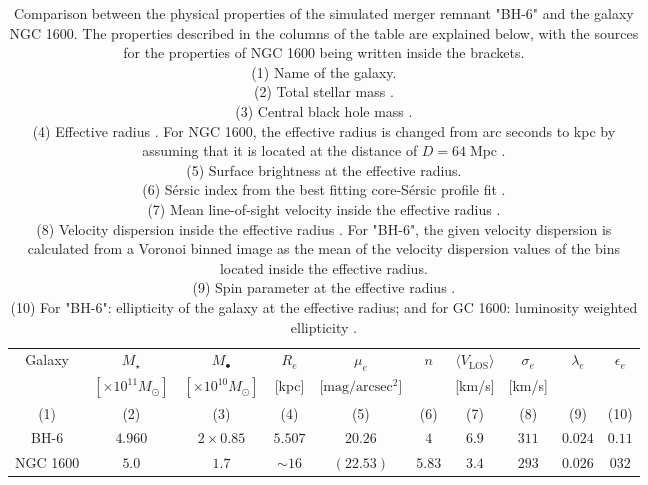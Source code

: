 \documentclass[english, oneside]{HYgradu}
\begin{document}
\begin{table}
	\begin{center}
		\scriptsize
		\begin{tabular}{c c c c c c c c c c}
		\hline
		\hline
		Galaxy & $M_\star$ & $M_\bullet$ & $R_e$ & $\mu_e$ & $n$ & 
		$\langle V_\mathrm{LOS} \rangle$ & $\sigma_e$ & $\lambda_e$ &
		$\epsilon_e$ \\
		& $[\times 10^{11} M_\odot]$ & $[\times 10^{10} M_\odot]$ &
		[kpc] & [$\mathrm{mag/arcsec^2}$] & & [km/s] & [km/s] & & \\
		(1) & (2) & (3) & (4) & (5) & (6) & (7) & (8) & (9) & (10) \\
		\hline
		BH-6 & $4.960$ & $2 \times 0.85$ & $5.507$ & $20.26$ & $4$ & $6.9$ & $311$ & $0.024$ & $0.11$ \\
		NGC 1600 & $5.0$ & $1.7$ & $\sim 16$ & $(22.53)$ & $5.83$ & $3.4$ & 
		$293$ & $0.026$ & $032$ \\
		\hline
		\end{tabular}
	\end{center}
	\caption{Comparison between the physical properties of the simulated merger remnant "BH-6" and the galaxy NGC 1600. The properties described in the columns of the table are explained below, with the sources for the properties of NGC 1600 being written inside the brackets. \\
	(1) Name of the galaxy. \\
	(2) Total stellar mass \citep{Thomas2016}. \\
	(3) Central black hole mass \citep{Thomas2016}. \\
	(4) Effective radius \citep{Thomas2016}. For NGC 1600, the effective radius is changed from arc seconds to kpc by assuming that it is located at the distance of $D = 64 \; \mathrm{Mpc}$ \citep{Thomas2016}. \\
	(5) Surface brightness at the effective radius. \\
	(6) Sérsic index from the best fitting core-Sérsic profile fit \citep{Thomas2016}. \\
	(7) Mean line-of-sight velocity inside the effective radius \citep{Bender1994}. \\
	(8) Velocity dispersion inside the effective radius \citep{Veale2017veldisp}. For "BH-6", the given velocity dispersion is calculated from a Voronoi binned image as the mean of the velocity dispersion values of the bins located inside the effective radius. \\
	(9) Spin parameter at the effective radius \citep{Veale2018lambda}. \\
	(10) For "BH-6": ellipticity of the galaxy at the effective radius; and for GC 1600: luminosity weighted ellipticity \citep{Goullaud2018}.
	}
\end{table}
\end{document}
